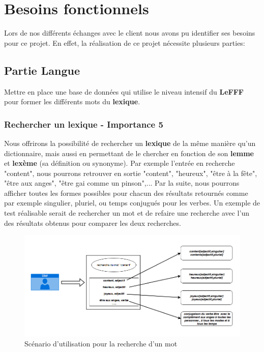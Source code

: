 \section{Besoins fonctionnels}
Lors de nos différents échanges avec le client nous avons pu identifier ses besoins pour ce projet. En effet, la réalisation de ce projet nécessite plusieurs parties:

\subsection{Partie Langue}
Mettre en place une base de données qui utilise le niveau intensif du \textbf{LeFFF} pour former les différents mots du \textbf{lexique}.

\subsubsection{Rechercher un lexique - Importance 5}

{Nous offrirons la possibilité de rechercher un \textbf{lexique} de la même manière qu'un dictionnaire, mais aussi en permettant de le chercher en fonction de son \textbf{lemme} et \textbf{lexème} (sa définition ou synonyme). Par exemple l'entrée en recherche "content", nous pourrons retrouver en sortie "content", "heureux", "être à la fête", "être aux anges", "être gai comme un pinson",... Par la suite, nous pourrons afficher toutes les formes possibles pour chacun des résultats retournés comme par exemple singulier, pluriel, ou temps conjugués pour les verbes. Un exemple de test réalisable serait de rechercher un mot et de refaire une recherche avec l'un des résultats obtenus pour comparer les deux recherches.\par}

\begin{figure}[ht]
    \centering
    \includegraphics[scale=0.5]{exemple.png}
    \caption{Scénario d'utilisation pour la recherche d'un mot }
\end{figure}
\newpage

